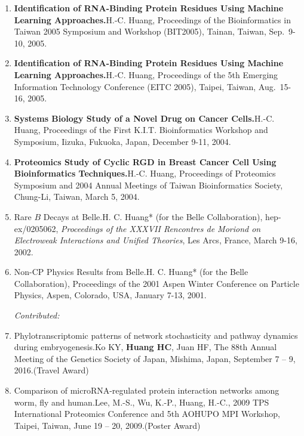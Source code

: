 \documentclass[10pt,a4paper]{article}
\def\mypub#1#2#3{{#1.}\newline #2, #3.}
\def\newpub#1#2#3{{\boldmath \bf #2.}\newline #1, #3.}
\begin{document}
\begin{enumerate}
\item
\newpub
{H.-C. Huang}
{Identification of RNA-Binding Protein Residues Using Machine Learning Approaches}
{Proceedings of the Bioinformatics in Taiwan 2005 Symposium and Workshop (BIT2005), Tainan, Taiwan, Sep.\ 9-10, 2005}

\item
\newpub
{H.-C. Huang}
{Identification of RNA-Binding Protein Residues Using Machine Learning Approaches}
{Proceedings of the 5th Emerging Information Technology Conference (EITC 2005), Taipei, Taiwan, Aug.\ 15-16, 2005}

\item
\newpub
{H.-C. Huang}
{Systems Biology Study of a Novel Drug on Cancer Cells}
{Proceedings of the First K.I.T. Bioinformatics Workshop and Symposium, Iizuka, Fukuoka, Japan, December 9-11, 2004}

\item
\newpub
{H.-C. Huang}
{Proteomics Study of Cyclic RGD in Breast Cancer Cell Using Bioinformatics Techniques}
{Proceedings of Proteomics Symposium and 2004 Annual Meetings of Taiwan Bioinformatics Society, Chung-Li, Taiwan, March 5, 2004}

\item 
\mypub{Rare $B$ Decays at Belle}
{H. C. Huang* (for the Belle Collaboration)}
{hep-ex/0205062, {\it Proceedings of 
the XXXVII Rencontres de Moriond on Electroweak Interactions and
Unified Theories}, Les Arcs, France, March 9-16, 2002}

\item
\mypub{Non-CP Physics Results from Belle}
{H. C. Huang* (for the Belle Collaboration)}
{Proceedings of the 2001 Aspen Winter Conference on Particle Physics, Aspen, Colorado, USA, January 7-13,  2001}

\vspace{6pt}
\hspace{-0.4in} {\it Contributed:}
~
\item
\mypub
{Phylotranscriptomic patterns of network stochasticity and pathway dynamics during embryogenesis}
{Ko KY, {\bf Huang HC}, Juan HF}
{The 88th Annual Meeting of the Genetics Society of Japan, Mishima, Japan, September 7 -- 9, 2016}(Travel Award)

\item
\mypub
{Comparison of microRNA-regulated protein interaction networks among worm, fly and human}
{Lee, M.-S., Wu, K.-P., Huang, H.-C.}
{2009 TPS International Proteomics Conference and 5th AOHUPO MPI Workshop, Taipei, Taiwan, June 19 -- 20, 2009}(Poster Award)


\end{enumerate}
\end{document}
